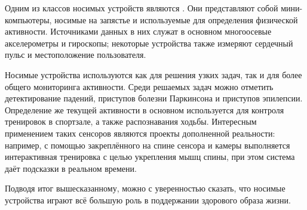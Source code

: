 Одним из классов носимых устройств являются . Они представляют собой мини-компьютеры, носимые на запястье и используемые для определения физической активности. Источниками данных в них служат в основном многоосевые акселерометры и гироскопы; некоторые устройства также измеряют сердечный пульс и местоположение пользователя. 

Носимые устройства используются как для решения узких задач, так и для более общего мониторинга активности. Среди решаемых задач можно отметить детектирование падений\cite{applications_falls}, приступов болезни Паркинсона\cite{applications_parkinson} и приступов эпилепсии\cite{applications_epileptic}. Определение же текущей активности в основном используется для контроля тренировок в спортзале, а также распознавания ходьбы. Интересным применением таких сенсоров являются проекты дополненной реальности: например, с помощью закреплённого на спине сенсора и камеры выполняется интерактивная тренировка с целью укрепления мышц спины, при этом система даёт подсказки в реальном времени\cite{applications_vr}. 

Подводя итог вышесказанному, можно с уверенностью сказать, что носимые устройства играют всё большую роль в поддержании здорового образа жизни.

